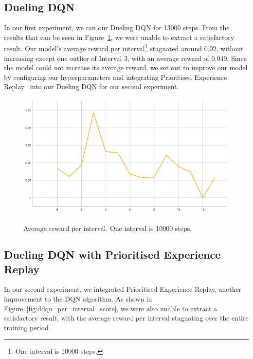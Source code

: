 \documentclass[12pt,a4paper]{article}
\begin{document}
    \subsection{Dueling DQN}\label{subsec:dueling-dqn}
    In our first experiment, we ran our Dueling DQN for 13000 steps.
    From the results that can be seen in Figure~\ref{fig:ddqn_interval_score}, we were unable to extract a satisfactory result.
    Our model's average reward per interval\footnote{One interval is 10000 steps.} stagnated around 0.02, without increasing except one outlier of Interval 3, with an average reward of 0.049.
    Since the model could not increase its average reward, we set out to improve our model by configuring our hyperparameters and integrating Prioritised Experience Replay~\citet{schaul16} into our Dueling DQN for our second experiment.
    \begin{figure}[h]
        \caption[DDQN: Average reward per interval.]{Average reward per interval. One interval is 10000 steps.}
        \centering
        \includegraphics[scale=0.5]{interval_score_ddqn}
        \label{fig:ddqn_interval_score}
    \end{figure}

    \subsection{Dueling DQN with Prioritised Experience Replay}\label{subsec:dueling-dqn-with-prioritised-experience-replay}
    In our second experiment, we integrated Prioritised Experience Replay, another improvement to the DQN algorithm.
    As shown in Figure~\ref{fig:ddqn_per_interval_score}, we were also unable to extract a satisfactory result, with the average reward per interval stagnating over the entire training period.
\end{document}
